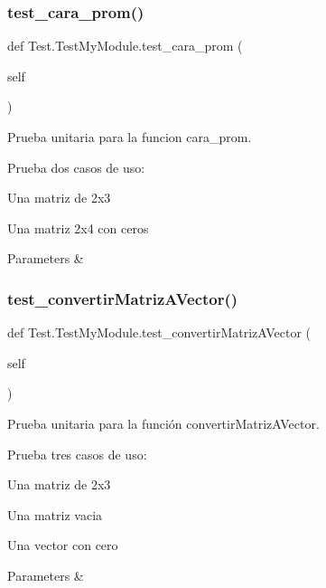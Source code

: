\subsubsection{\texorpdfstring{test\+\_\+cara\+\_\+prom()}{test\_cara\_prom()}}
{\footnotesize\ttfamily def Test.\+Test\+My\+Module.\+test\+\_\+cara\+\_\+prom (\begin{DoxyParamCaption}\item[{}]{self }\end{DoxyParamCaption})}



Prueba unitaria para la funcion cara\+\_\+prom. 

Prueba dos casos de uso\+:
\begin{DoxyEnumerate}
\item Una matriz de 2x3
\item Una matriz 2x4 con ceros
\end{DoxyEnumerate}


\begin{DoxyParams}{Parameters}
{\em } & \\
\hline
\end{DoxyParams}
\mbox{\label{class_test_1_1_test_my_module_a3bd24c5133eed43ca6136f656a87631c}} 
\subsubsection{\texorpdfstring{test\+\_\+convertir\+Matriz\+A\+Vector()}{test\_convertirMatrizAVector()}}
{\footnotesize\ttfamily def Test.\+Test\+My\+Module.\+test\+\_\+convertir\+Matriz\+A\+Vector (\begin{DoxyParamCaption}\item[{}]{self }\end{DoxyParamCaption})}



Prueba unitaria para la función convertir\+Matriz\+A\+Vector. 

Prueba tres casos de uso\+:
\begin{DoxyEnumerate}
\item Una matriz de 2x3
\item Una matriz vacia
\item Una vector con cero 
\begin{DoxyParams}{Parameters}
{\em } & \\
\hline
\end{DoxyParams}

\end{DoxyEnumerate}\mbox{\label{class_test_1_1_test_my_module_a0cd4d23560e53612142c3d8a48a74f37}} 
